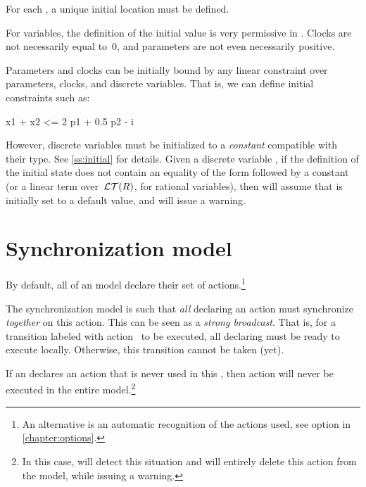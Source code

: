 For each \IPTA{}, a unique initial location must be defined.

For variables, the definition of the initial value is very permissive in \imitator{}.
Clocks are not necessarily equal to~0, and parameters are not even necessarily positive.

Parameters and clocks can be initially bound by any linear constraint over parameters, clocks, and discrete variables.
That is, we can define initial constraints such as:

\begin{IMITATORmodel}
x1 + x2 <= 2 p1 + 0.5 p2 - i
\end{IMITATORmodel}

However, discrete variables must be initialized to a \emph{constant} compatible with their type.
See \cref{ss:initial} for details.
Given a discrete variable , if the definition of the initial state does not contain an equality of the form  followed by a constant (or a linear term over~$\mathcal{LT}(R)$, for rational variables), then \imitator{} will assume that  is initially set to a default value, and will issue a warning.



\section{Synchronization model}\label{sect:synchronization}

By default, all \IPTA{} of an \imitator{} model declare their set of actions.\footnote{%
	An alternative is an automatic recognition of the actions used, see option  in \cref{chapter:options}.
}

The \imitator{} synchronization model is such that \emph{all} \IPTA{} declaring an action must synchronize \emph{together} on this action.
This can be seen as a \emph{strong broadcast}.
That is, for a transition labeled with action~ to be executed, all \IPTA{} declaring  must be ready to execute  locally.
Otherwise, this transition cannot be taken (yet).

If an \IPTA{} declares an action  that is never used in this \IPTA{}, then action  will never be executed in the entire model.\footnote{%
	In this case, \imitator{} will detect this situation and will entirely delete this action from the model, while issuing a warning.
}

